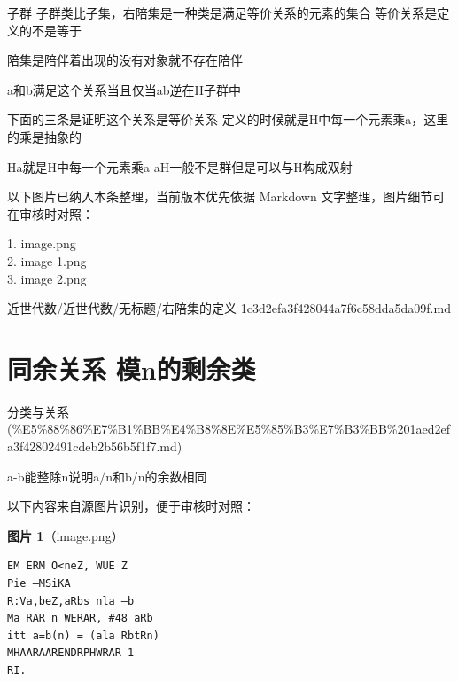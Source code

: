 \begin{definition}[右陪集的定义]

子群 子群类比子集，右陪集是一种类是满足等价关系的元素的集合 等价关系是定义的不是等于

陪集是陪伴着出现的没有对象就不存在陪伴

a和b满足这个关系当且仅当ab逆在H子群中

下面的三条是证明这个关系是等价关系 定义的时候就是H中每一个元素乘a，这里的乘是抽象的

Ha就是H中每一个元素乘a aH一般不是群但是可以与H构成双射

\end{definition}

\begin{note}[关联图片]
以下图片已纳入本条整理，当前版本优先依据 Markdown 文字整理，图片细节可在审核时对照：

1. image.png\\
2. image 1.png\\
3. image 2.png\\

\end{note}

\begin{note}[来源路径]

近世代数/近世代数/无标题/右陪集的定义 1c3d2efa3f428044a7f6c58dda5da09f.md

\end{note}

\section*{同余关系 模n的剩余类}

\begin{note}[来源上级主题]

分类与关系 (\%E5\%88\%86\%E7\%B1\%BB\%E4\%B8\%8E\%E5\%85\%B3\%E7\%B3\%BB\%201aed2efa3f42802491cdeb2b56b5f1f7.md)

\end{note}

\begin{note}

a-b能整除n说明a/n和b/n的余数相同

\end{note}

\begin{note}
以下内容来自源图片识别，便于审核时对照：

\textbf{图片 1}（image.png）
\begin{Verbatim}[fontsize=\small]
EM ERM O<neZ, WUE Z
Pie —MSiKA
R:Va,beZ,aRbs nla —b
Ma RAR n WERAR, #48 aRb
itt a=b(n) = (ala RbtRn)
MHAARAARENDRPHWRAR 1
RI.
\end{Verbatim}

\end{note}

